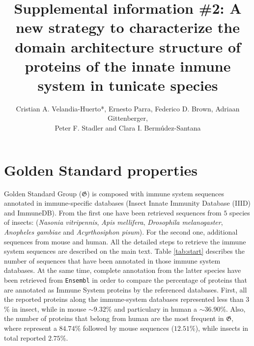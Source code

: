 \documentclass[12pt]{article}
\title{Supplemental information \#2: A new strategy to characterize the domain 
architecture structure of proteins of the innate inmune system in tunicate 
species}
\author{Cristian A. Velandia-Huerto*, Ernesto Parra, Federico D. 
Brown, Adriaan Gittenberger, \\ Peter F. Stadler and Clara I. 
Berm\'{u}dez-Santana}
\begin{document}
\maketitle


\section*{Golden Standard properties}

Golden Standard Group ($\boldsymbol{\mathfrak{G}}$) is composed with immune system sequences annotated in immune-specific databases (Insect Innate Immunity Database (IIID) and ImmuneDB). From the first one have been retrieved sequences from $5$ species of insects: (\textsl{Nasonia vitripennis}, \textsl{Apis mellifera}, \textsl{Drosophila melanogaster}, \textsl{Anopheles gambiae} and \textsl{Acyrthosiphon pisum}). For the second one,  additional sequences from mouse and human. All the detailed steps to retrieve the immune system sequences are described on the main text. Table \ref{tab:start} describes the number of sequences that have been annotated in those immune system databases. At the same time, complete annotation from the latter species have been retrieved from \texttt{Ensembl} in order to compare the percentage of proteins that are annotated as Immune System proteins by the referenced databases. 
First, all the reported proteins along the immune-system databases represented less than $3$\% in insect, while in mouse $\sim 9.32$\% and particulary in human a $\sim 36.90$\%. Also, the number of proteins that belong from human are the most frequent in $\boldsymbol{\mathfrak{G}}$, where represent a $84.74$\% followed by mouse sequences ($12.51$\%), while insects in total reported $2.75$\%.   
\end{document}

